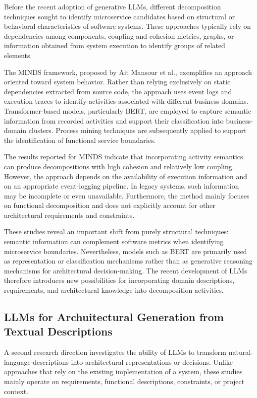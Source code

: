 \documentclass[acmsmall,screen,anonymous,review]{acmart}
\begin{document}
Before the recent adoption of generative LLMs, different decomposition techniques sought to identify microservice candidates based on structural or behavioral characteristics of software systems. These approaches typically rely on dependencies among components, coupling and cohesion metrics, graphs, or information obtained from system execution to identify groups of related elements.

The MINDS framework, proposed by Ait Mansour et al., exemplifies an approach oriented toward system behavior. Rather than relying exclusively on static dependencies extracted from source code, the approach uses event logs and execution traces to identify activities associated with different business domains. Transformer-based models, particularly BERT, are employed to capture semantic information from recorded activities and support their classification into business-domain clusters. Process mining techniques are subsequently applied to support the identification of functional service boundaries.

The results reported for MINDS indicate that incorporating activity semantics can produce decompositions with high cohesion and relatively low coupling. However, the approach depends on the availability of execution information and on an appropriate event-logging pipeline. In legacy systems, such information may be incomplete or even unavailable. Furthermore, the method mainly focuses on functional decomposition and does not explicitly account for other architectural requirements and constraints.

These studies reveal an important shift from purely structural techniques: semantic information can complement software metrics when identifying microservice boundaries. Nevertheless, models such as BERT are primarily used as representation or classification mechanisms rather than as generative reasoning mechanisms for architectural decision-making. The recent development of LLMs therefore introduces new possibilities for incorporating domain descriptions, requirements, and architectural knowledge into decomposition activities.


\subsection{LLMs for Archuitectural Generation from Textual Descriptions}

A second research direction investigates the ability of LLMs to transform natural-language descriptions into architectural representations or decisions. Unlike approaches that rely on the existing implementation of a system, these studies mainly operate on requirements, functional descriptions, constraints, or project context.
\end{document}

